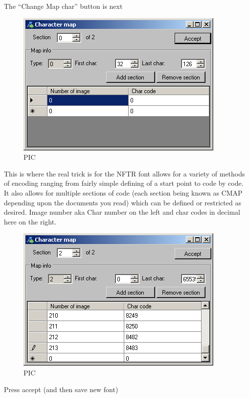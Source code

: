 \documentclass[
]{book}
\begin{document}
The ``Change Map char'' button is next

\begin{figure}
\centering
\includegraphics{images/118_home_fast6191_romhackingguide_unrenamed_fil___nal_borders_romhackingguidefontnftradding_2.png}
\caption{PIC}
\end{figure}

This is where the real trick is for the NFTR font allows for a variety of methods of encoding ranging from fairly simple defining of a start point to code by code. It also allows for multiple sections of code (each section being known as CMAP depending upon the documents you read) which can be defined or restricted as desired. Image number aka Char number on the left and char codes in decimal here on the right.

\begin{figure}
\centering
\includegraphics{images/119_home_fast6191_romhackingguide_unrenamed_fil___nal_borders_romhackingguidefontnftradding_3.png}
\caption{PIC}
\end{figure}

Press accept (and then save new font)
\end{document}
